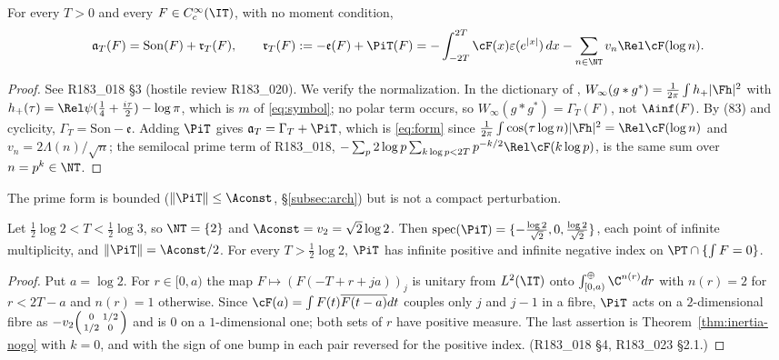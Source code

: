 \begin{theorem}\label{thm:inertia-split}
For every $T>0$ and every $F\in C_c^\infty(\IT)$, with no moment condition,
\[
\mathfrak a_T(F)=\mathrm{Son}(F)+\mathfrak r_T(F),\qquad
\mathfrak r_T(F):=-\mathfrak e(F)+\PiT(F)
=-\int_{-2T}^{2T}\cF(x)\varepsilon(e^{|x|})\,dx-\sum_{n\in\NT}v_n\Rel\cF(\log n).
\]
\end{theorem}
\begin{proof}
See R183\_018 \S3 (hostile review R183\_020). We verify the normalization. In the dictionary of
\cite[(152)--(154)]{ConnesConsani2021}, $W_\infty(g*g^*)=\frac1{2\pi}\int h_+|\Fh|^2$ with
$h_+(\tau)=\Rel\psi(\frac14+\frac{i\tau}2)-\log\pi$, which is $m$ of \eqref{eq:symbol}; no polar term occurs, so
$W_\infty(g*g^*)=\Gamma_T(F)$, not $\Ainf(F)$. By (83) and cyclicity, $\Gamma_T=\mathrm{Son}-\mathfrak e$. Adding
$\PiT$ gives $\mathfrak a_T=\Gamma_T+\PiT$, which is \eqref{eq:form} since
$\frac1{2\pi}\int\cos(\tau\log n)|\Fh|^2=\Rel\cF(\log n)$ and $v_n=2\Lambda(n)/\sqrt n$; the semilocal prime term of
R183\_018, $-\sum_{p}2\log p\sum_{k\log p<2T}p^{-k/2}\Rel\cF(k\log p)$, is the same sum over $n=p^k\in\NT$.
\end{proof}

The prime form is bounded ($\|\PiT\|\le\Aconst$, \S\ref{subsec:arch}) but is not a compact perturbation.

\begin{proposition}\label{thm:inertia-B2}
Let $\frac12\log2<T<\frac12\log3$, so $\NT=\{2\}$ and $\Aconst=v_2=\sqrt2\log2$. Then
$\operatorname{spec}(\PiT)=\{-\frac{\log2}{\sqrt2},0,\frac{\log2}{\sqrt2}\}$, each point of infinite multiplicity,
and $\|\PiT\|=\Aconst/2$. For every $T>\frac12\log2$, $\PiT$ has infinite positive and infinite negative index
on $\PT\cap\{\int F=0\}$.
\end{proposition}
\begin{proof}
Put $a=\log2$. For $r\in[0,a)$ the map $F\mapsto(F(-T+r+ja))_{j}$ is unitary from $L^2(\IT)$ onto
$\int^\oplus_{[0,a)}\C^{n(r)}dr$ with $n(r)=2$ for $r<2T-a$ and $n(r)=1$ otherwise. Since
$\cF(a)=\int F(t)\overline{F(t-a)}dt$ couples only $j$ and $j-1$ in a fibre, $\PiT$ acts on a $2$-dimensional fibre
as $-v_2\begin{psmallmatrix}0&1/2\\1/2&0\end{psmallmatrix}$ and is $0$ on a $1$-dimensional one; both sets of $r$
have positive measure. The last assertion is Theorem~\ref{thm:inertia-nogo} with $k=0$, and with the sign of one
bump in each pair reversed for the positive index. (R183\_018 \S4, R183\_023 \S2.1.)
\end{proof}

